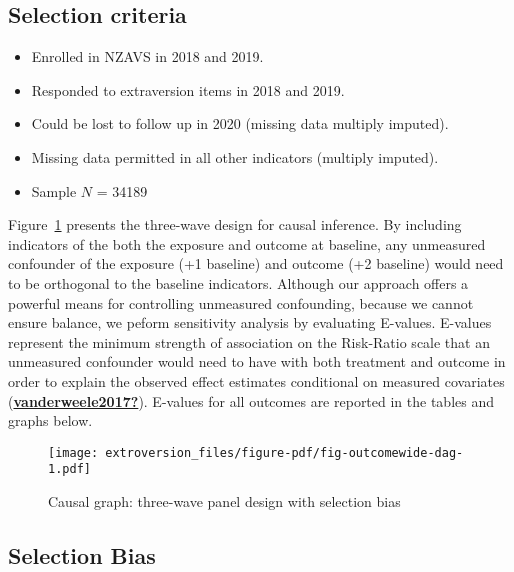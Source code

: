 \documentclass[
  singlecolumn]{report}
\providecommand{\tightlist}{%
  \setlength{\itemsep}{0pt}\setlength{\parskip}{0pt}}\usepackage{longtable,booktabs,array}
\begin{document}
\hypertarget{selection-criteria}{%
\subsection{Selection criteria}\label{selection-criteria}}

\begin{itemize}
\tightlist
\item
  Enrolled in NZAVS in 2018 and 2019.
\item
  Responded to extraversion items in 2018 and 2019.
\item
  Could be lost to follow up in 2020 (missing data multiply imputed).
\item
  Missing data permitted in all other indicators (multiply imputed).
\item
  Sample \(N\) = 34189
\end{itemize}

Figure~\ref{fig-outcomewide-dag} presents the three-wave design for
causal inference. By including indicators of the both the exposure and
outcome at baseline, any unmeasured confounder of the exposure (+1
baseline) and outcome (+2 baseline) would need to be orthogonal to the
baseline indicators. Although our approach offers a powerful means for
controlling unmeasured confounding, because we cannot ensure balance, we
peform sensitivity analysis by evaluating E-values. E-values represent
the minimum strength of association on the Risk-Ratio scale that an
unmeasured confounder would need to have with both treatment and outcome
in order to explain the observed effect estimates conditional on
measured covariates
(\protect\hyperlink{ref-vanderweele2017}{\textbf{vanderweele2017?}}).
E-values for all outcomes are reported in the tables and graphs below.

\begin{figure}

{\centering \texttt{[image: extroversion\_files/figure-pdf/fig-outcomewide-dag-1.pdf]}

}

\caption{\label{fig-outcomewide-dag}Causal graph: three-wave panel
design with selection bias}

\end{figure}

\hypertarget{selection-bias}{%
\subsection{Selection Bias}\label{selection-bias}}
\end{document}
